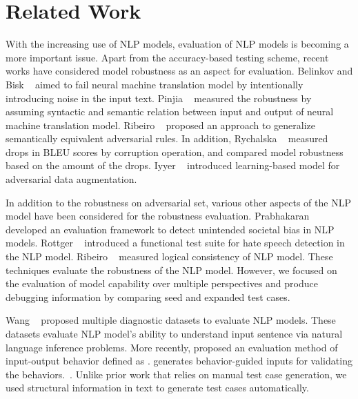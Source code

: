 \vspace{-6pt}
\section{Related Work}

%
With the increasing use of NLP models, evaluation of NLP models is
becoming a more important issue. Apart from the accuracy-based testing
scheme, recent works have considered model robustness as an
aspect for evaluation. Belinkov and Bisk
\textit{\etal}~\cite{belinkov2018breaknmt} aimed to fail neural machine
translation model by intentionally introducing noise in the input
text. Pinjia
\textit{\etal}~\cite{pinjia2020structinvtestingnmt,pinjia2020testnmtrt}
measured the robustness by assuming syntactic and semantic relation
between input and output of neural machine translation model.  Ribeiro
\textit{\etal}~\cite{ribeiro2018sear} proposed an approach to
generalize semantically equivalent adversarial rules. In addition,
Rychalska \textit{\etal}~\cite{rychalska2019wildnlp} measured drops in
BLEU scores by corruption operation, and compared model robustness
based on the amount of the drops. Iyyer
\textit{\etal}~\cite{iyyer2018adversarial} introduced learning-based
model for adversarial data augmentation.

In addition to the
robustness on adversarial set, various other aspects of the NLP model have been
considered for the robustness evaluation. Prabhakaran
\textit{\etal}~\cite{prabhakaran2019fairness} developed an evaluation
framework to detect unintended societal bias in NLP models. Rottger
\textit{\etal}~\cite{rottger2020hatecheck} introduced a functional
test suite for hate speech detection in the NLP model.  Ribeiro
\textit{\etal}~\cite{ribeiro2019consistencyeval} measured logical
consistency of NLP model. These techniques evaluate the robustness of
the NLP model. However, we focused on the evaluation of model capability
over multiple perspectives and produce debugging information by comparing
seed and expanded test cases.

%
Wang \textit{\etal}~\cite{wang2018glue, wang2019superglue} proposed
multiple diagnostic datasets to evaluate NLP models. These datasets
evaluate NLP model's ability to understand input sentence via natural
language inference problems. More recently, \Cklst proposed an evaluation
method of input-output behavior defined as \lcs. \Cklst generates
behavior-guided inputs for validating the
behaviors.~\cite{marcoACL2020checklist}. Unlike prior work that relies on manual
test case generation, we used structural information in text to
generate test cases automatically.

